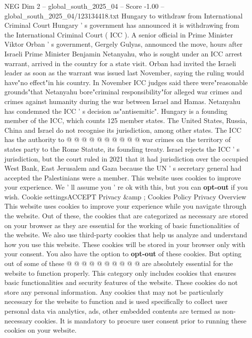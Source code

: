 \begin{textsample}{NEG Dim 2 – global\_south\_2025\_04 – Score -1.00 – global\_south\_2025\_04/123134418.txt}  \label{ex:f2_neg_169}
Hungary to withdraw from International Criminal Court Hungary ' s government has announced it is withdrawing from the International Criminal Court ( ICC ).
A senior official in Prime Minister Viktor Orban ' s government, Gergely Gulyas, announced the move, hours after Israeli Prime Minister Benjamin Netanyahu, who is sought under an ICC arrest warrant, arrived in the country for a state visit.
Orban had invited the Israeli leader as soon as the warrant was issued last November, saying the ruling would have"no effect"in his country.
In November ICC judges said there were"reasonable grounds"that Netanyahu bore"criminal responsibility"for alleged war crimes and crimes against humanity during the war between Israel and Hamas.
Netanyahu has condemned the ICC ' s decision as"antisemitic".
Hungary is a founding member of the ICC, which counts 125 member states.
The United States, Russia, China and Israel do not recognise its jurisdiction, among other states.
The ICC has the authority to @ @ @ @ @ @ @ @ @ @ war crimes on the territory of states party to the Rome Statute, its founding treaty.
Israel rejects the ICC ' s jurisdiction, but the court ruled in 2021 that it had jurisdiction over the occupied West Bank, East Jerusalem and Gaza because the UN ' s secretary general had accepted the Palestinians were a member.
This website uses cookies to improve your experience.
We ' ll assume you ' re ok with this, but you can \textbf{opt-out} if you wish.
Cookie settingsACCEPT Privacy \&amp ; Cookies Policy Privacy Overview This website uses cookies to improve your experience while you navigate through the website.
Out of these, the cookies that are categorized as necessary are stored on your browser as they are essential for the working of basic functionalities of the website.
We also use third-party cookies that help us analyze and understand how you use this website.
These cookies will be stored in your browser only with your consent.
You also have the option to \textbf{opt-out} of these cookies.
But opting out of some of these @ @ @ @ @ @ @ @ @ @ are absolutely essential for the website to function properly.
This category only includes cookies that ensures basic functionalities and security features of the website.
These cookies do not store any personal information.
Any cookies that may not be particularly necessary for the website to function and is used specifically to collect user personal data via analytics, ads, other embedded contents are termed as non-necessary cookies.
It is mandatory to procure user consent prior to running these cookies on your website.

\end{textsample}
